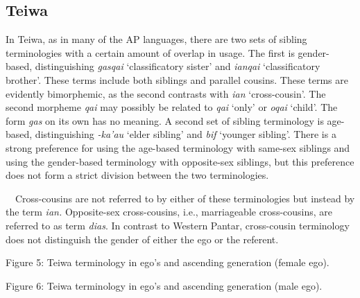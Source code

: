 \subsection[Teiwa]{Teiwa}
\hypertarget{RefHeading78019871885726}{}\label{bkm:Ref247777020}In Teiwa, as in many of the AP languages, there are two sets of sibling terminologies with a certain amount of overlap in usage. The first is gender-based, distinguishing \textit{gasqai }{\textquoteleft}classificatory sister{\textquoteright} and \textit{ianqai }{\textquoteleft}classificatory brother{\textquoteright}. These terms include both siblings and parallel cousins. These terms are evidently bimorphemic, as the second contrasts with \textit{ian} {\textquoteleft}cross-cousin{\textquoteright}. The second morpheme \textit{qai }may possibly be related to \textit{qai }{\textquoteleft}only{\textquoteright} or \textit{oqai }{\textquoteleft}child{\textquoteright}. The form \textit{gas }on its own has no meaning. A second set of sibling terminology is age-based, distinguishing \textit{{}-ka{\textquoteright}au }{\textquoteleft}elder sibling{\textquoteright} and \textit{bif } {\textquoteleft}younger sibling{\textquoteright}. There is a strong 
preference for using the age-based terminology with same-sex siblings and using the gender-based terminology with opposite-sex siblings, but this preference does not form a strict division between the two terminologies. 

\ \ Cross-cousins are not referred to by either of these terminologies but instead by the term \textit{ian.} Opposite-sex cross-cousins, i.e., marriageable cross-cousins, are referred to as term \textit{dias}. In contrast to Western Pantar, cross-cousin terminology does not distinguish the gender of either the ego or the referent.

{\centering
Figure 5: Teiwa terminology in ego{\textquoteright}s and ascending generation (female ego). 
\par}

{%
 \par}

{\centering
Figure 6: Teiwa terminology in ego{\textquoteright}s and ascending generation (male ego). 
\par}

{%
 \par}

